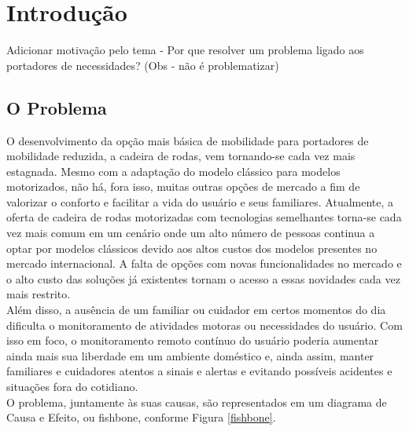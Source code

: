 \chapter{Introdução}

Adicionar motivação pelo tema - Por que resolver um problema ligado aos portadores de necessidades? (Obs - não é problematizar)

\section{O Problema}

O desenvolvimento da opção mais básica de mobilidade para portadores de mobilidade
reduzida, a cadeira de rodas, vem tornando-se cada vez mais estagnada. 
Mesmo com a adaptação do modelo clássico para modelos motorizados, não há, 
fora isso, muitas outras opções de mercado a fim de valorizar o conforto 
e facilitar a vida do usuário e seus familiares. Atualmente, a oferta de 
cadeira de rodas motorizadas com tecnologias semelhantes torna-se cada 
vez mais comum em um cenário onde um alto número de pessoas continua a optar 
por modelos clássicos devido aos altos custos dos modelos presentes no 
mercado internacional. A falta de opções com novas funcionalidades no mercado 
e o alto custo das soluções já existentes tornam o acesso a essas novidades
 cada vez mais restrito.\\
	
Além disso, a ausência de um familiar ou cuidador em certos momentos 
do dia 
dificulta o monitoramento de atividades motoras ou necessidades 
do usuário. 
Com isso em foco, o monitoramento remoto contínuo do usuário 
poderia 
aumentar ainda mais sua liberdade em um ambiente doméstico e, ainda 
assim, 
manter familiares e cuidadores atentos a sinais e alertas e evitando 
possíveis 
acidentes e situações fora do cotidiano.\\
	
O problema, juntamente às suas causas, são representados em um diagrama 
de Causa e Efeito, ou fishbone, conforme Figura \ref{fishbone}.
	
